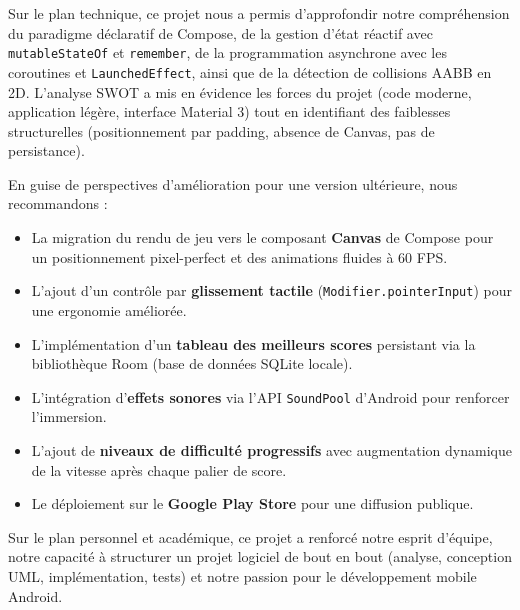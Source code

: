 \documentclass[12pt,a4paper]{report}
\begin{document}
Sur le plan technique, ce projet nous a permis d'approfondir notre compr\'ehension du paradigme d\'eclaratif de Compose, de la gestion d'\'etat r\'eactif avec \texttt{mutableStateOf} et \texttt{remember}, de la programmation asynchrone avec les coroutines et \texttt{LaunchedEffect}, ainsi que de la d\'etection de collisions AABB en 2D. L'analyse SWOT a mis en \'evidence les forces du projet (code moderne, application l\'eg\`ere, interface Material 3) tout en identifiant des faiblesses structurelles (positionnement par padding, absence de Canvas, pas de persistance).

En guise de perspectives d'am\'elioration pour une version ult\'erieure, nous recommandons :
\begin{itemize}
    \item La migration du rendu de jeu vers le composant \textbf{Canvas} de Compose pour un positionnement pixel-perfect et des animations fluides \`a 60 FPS.
    \item L'ajout d'un contr\^ole par \textbf{glissement tactile} (\texttt{Modifier.pointerInput}) pour une ergonomie am\'elior\'ee.
    \item L'impl\'ementation d'un \textbf{tableau des meilleurs scores} persistant via la biblioth\`eque Room (base de donn\'ees SQLite locale).
    \item L'int\'egration d'\textbf{effets sonores} via l'API \texttt{SoundPool} d'Android pour renforcer l'immersion.
    \item L'ajout de \textbf{niveaux de difficult\'e progressifs} avec augmentation dynamique de la vitesse apr\`es chaque palier de score.
    \item Le d\'eploiement sur le \textbf{Google Play Store} pour une diffusion publique.
\end{itemize}

Sur le plan personnel et acad\'emique, ce projet a renforc\'e notre esprit d'\'equipe, notre capacit\'e \`a structurer un projet logiciel de bout en bout (analyse, conception UML, impl\'ementation, tests) et notre passion pour le d\'eveloppement mobile Android.

\newpage
\end{document}
